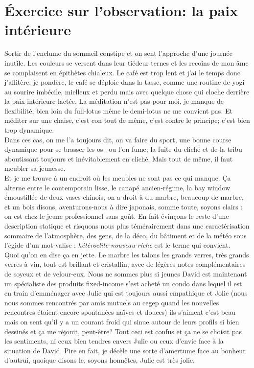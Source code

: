 

\section*{Éxercice sur l'observation: la paix intérieure}
Sortir de l'enclume du sommeil constipe et on sent l'approche d'une journée
inutile. Les couleurs se versent dans leur tiédeur ternes et les
recoins de mon âme se complaisent en épithètes chialeux. Le café est
trop lent et j'ai le temps donc j'allitère, je pondère, le
café se déploie dans la tasse, comme une routine de yogi au sourire imbécile,
mielleux et perdu mais avec quelque chose qui cloche derrière la paix
intérieure lactée. La  méditation n'est pas pour moi, je manque de flexibilité,
bien loin du full-lotus même le demi-lotus ne me convient pas. Et méditer sur
une chaise, c'est con tout de même, c'est contre le principe; c'est bien trop dynamique.\\

Dans ces cas, on me l'a toujours dit, on va faire du sport, une bonne course
dynamique pour se brasser les os --ou l'on fume; la fuite du
cliché et de la tribu aboutissant toujours et inévitablement en cliché. Mais
tout de même, il faut meubler sa jeunesse.\\

Et je me trouve à un endroit où les meubles ne sont pas ce qui manque.  Ça
alterne entre le contemporain lisse, le canapé ancien-régime, la bay window
émoustillée de  deux vases chinois, on a droit à du marbre, beaucoup de marbre, et un bois
disons, aventurons-nous à dire japonais, somme toute, soyons clairs :
on est chez le jeune professionnel sans goût.
En fait évinçons le reste d'une description statique et 
risquons nous plus témérairement dans une caractérisation sommaire de
l'atmosphère, des gens, de la déco, du bâtiment et de la météo sous l'égide d'un
mot-valise : \emph{hétéroclite-nouveau-riche} est le terme qui convient. \\

Quoi qu'on en dise ça en jette. Le marbre les talons les grands verres, très
grands verres à vin, tout est brillant et cristallin, avec de légères notes
complémentaires de soyeux et de velour-eux. Nous ne sommes plus si jeunes
David est maintenant un spécialiste des produits fixed-income s'est acheté un
condo dans lequel il est en train d'emménager avec Julie qui est toujours aussi
empathique et Jolie (nous nous sommes rencontrés par amis mutuels au cegep
quand les nouvelles rencontres étaient encore spontanées naïves et douces) ils
s'aiment c'est beau mais on sent qu'il y a un courant froid qui sinue autour de
leurs profils si bien dessinés et ça me réjouit, peut-être? Tout ceci est
confus et ça ne se choisit pas les sentiments, ni ceux bien tendres envers Julie
ou ceux d'envie face à la situation de David. Pire en fait, je décèle une sorte
d'amertume face au bonheur d'autrui, quoique disons le, soyons honnêtes,  Julie
est très jolie. \\

